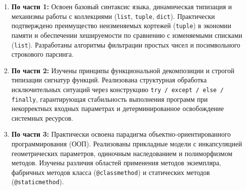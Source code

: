 \documentclass[14pt,a4paper]{extarticle}
\begin{document}
\begin{enumerate}
    \item \textbf{По части 1:} Освоен базовый синтаксис языка, динамическая типизация и механизмы работы с коллекциями (\texttt{list}, \texttt{tuple}, \texttt{dict}). Практически подтверждено преимущество неизменяемых кортежей (\texttt{tuple}) в экономии памяти и обеспечении хешируемости по сравнению с изменяемыми списками (\texttt{list}). Разработаны алгоритмы фильтрации простых чисел и посимвольного строкового парсинга.
    \item \textbf{По части 2:} Изучены принципы функциональной декомпозиции и строгой типизации сигнатур функций. Реализована структурная обработка исключительных ситуаций через конструкцию \texttt{try / except / else / finally}, гарантирующая стабильность выполнения программ при некорректных входных параметрах и детерминированное освобождение системных ресурсов.
    \item \textbf{По части 3:} Практически освоена парадигма объектно-ориентированного программирования (ООП). Реализованы прикладные модели с инкапсуляцией геометрических параметров, одиночным наследованием и полиморфизмом методов. Изучены различия областей применения методов экземпляра, фабричных методов класса (\texttt{@classmethod}) и статических методов (\texttt{@staticmethod}).
\end{enumerate}
\end{document}
